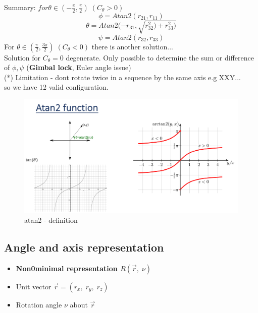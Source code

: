 \documentclass{article}
\begin{document}
\begin{enumerate}
     Summary:
     $for \theta \in (-\frac{\pi}{2}, \frac{\pi}{2})\; (C_{\theta}>0)$
     $$ \phi = Atan2(r_{21}, r_{11})$$
     $$ \theta = Atan2(-r_{31}, \sqrt{r^{2}_{32}) + r^{2}_{33}) } $$
     $$ \psi = Atan2(r_{32}, r_{33})$$
     For $\theta \in (\frac{\pi}{2}, \frac{3\pi}{2})\; (C_{\theta}<0)$  there is another solution... \\
    Solution for $C_\theta = 0$ degenerate. Only possible to determine the sum or difference of $\phi, \psi$ (\textbf{Gimbal lock}, Euler angle issue)
 \\
 (*) Limitation - dont rotate twice in a sequence by the same axis e.g XXY...\\
 so we have 12 valid configuration.

    \begin{figure}[h!]
    \includegraphics[scale=1.3]{atan2.png}
    \caption{atan2 - definition}
    \label{fig:sr}
    \end{figure}
    \end{enumerate}



\newpage
\subsection{Angle and axis representation}
\begin{itemize}
    \item \textbf{Non0minimal representation $R(\vec{r},\; \nu )$}
    \item Unit vector $\vec{r} = (r_{x}, \; r_{y}, \; r_{z} )$
    \item Rotation angle $ \nu $ about $ \vec{r} $
\end{itemize}
\end{document}

